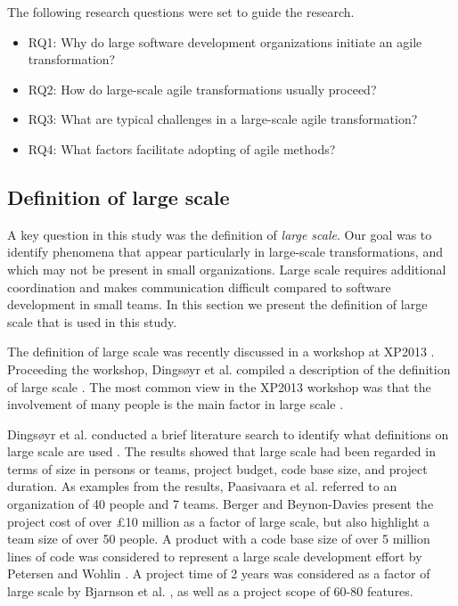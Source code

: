 \documentclass[preprint,authoryear,12pt]{elsarticle}
\begin{document}
The following research questions were set to guide the research.

\begin{itemize}

\item
RQ1: Why do large software development organizations initiate an agile
transformation?

\item
RQ2: How do large-scale agile transformations usually proceed?

\item
RQ3: What are typical challenges in a large-scale agile transformation?

\item
RQ4: What factors facilitate adopting of agile methods?

\end{itemize}


\subsection{Definition of large scale}
\label{sec:largescale}

A key question in this study was the definition of \emph{large scale}. Our goal
was to identify phenomena that appear particularly in large-scale
transformations, and which may not be present in small organizations. Large
scale requires additional coordination and makes communication difficult
compared to software development in small teams. In this section we present the
definition of large scale that is used in this study.

The definition of large scale was recently discussed in a workshop at XP2013
\cite{Dingsoyr2013a}. Proceeding the workshop, Dingsøyr et al.
compiled a description of the definition of large scale \cite{Dingsoyr2013b}.
The most common view in the XP2013 workshop was that the involvement of many
people is the main factor in large scale \cite{Dingsoyr2013b}.

Dingsøyr et al. conducted a brief literature search to identify what definitions
on large scale are used \cite{Dingsoyr2013b}. The results showed that large
scale had been regarded in terms of size in persons or teams, project budget,
code base size, and project duration. As examples from the results, Paasivaara
et al. \cite{Paasivaara2008} referred to an organization of 40 people and 7
teams. Berger and Beynon-Davies \cite{Berger2009} present the project cost of
over £10 million as a factor of large scale, but also highlight a team size of
over 50 people. A product with a code base size of over 5 million lines of code
was considered to represent a large scale development effort by Petersen and
Wohlin \cite{Petersen2010}. A project time of 2 years was considered as a factor
of large scale by Bjarnson et al. \cite{Bjarnason2011}, as well as a project
scope of 60-80 features.
\end{document}
